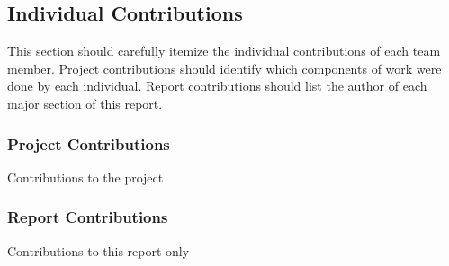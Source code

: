 \subsection{Individual Contributions}
{\color{red}
This section should carefully itemize the individual contributions of each team 
member. Project contributions should identify which components of work were done 
by each individual. Report contributions should list the author of each major 
section of this report.
}

\subsubsection{Project Contributions}
{\color{red}
Contributions to the project
}

\subsubsection{Report Contributions}
{\color{red}
Contributions to this report only
}